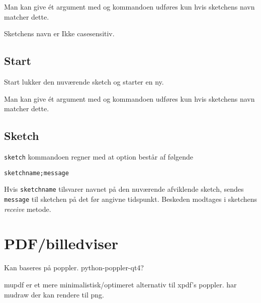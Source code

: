 \documentclass[10pt,a4paper,danish]{article}
\begin{document}
Man kan give ét argument med og kommandoen udføres kun hvis sketchens navn
matcher dette.

Sketchens navn er Ikke casesensitiv.

\subsection{Start}
Start lukker den nuværende sketch og starter en ny.

Man kan give ét argument med og kommandoen udføres kun hvis sketchens navn
matcher dette.

\subsection{Sketch}
\texttt{sketch} kommandoen regner med at option består af følgende
\begin{verbatim}
sketchname;message
\end{verbatim}

Hvis \texttt{sketchname} tilsvarer navnet på den nuværende afviklende sketch,
sendes \texttt{message} til sketchen på det før angivne tidspunkt.
Beskeden modtages i sketchens \textit{receive} metode.

\section{PDF/billedviser}
Kan baseres på poppler.
python-poppler-qt4?

mupdf er et mere minimalistisk/optimeret alternativ til xpdf's poppler.
har mudraw der kan rendere til png.

% 
% 
\end{document}
